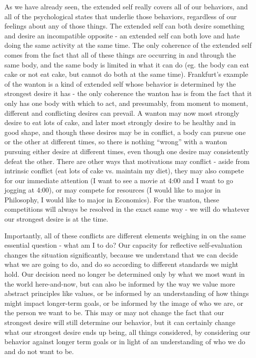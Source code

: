 \documentclass[phd,12pt,oneside,paper=letterpaper]{ubcthesis}
\begin{document}
As we have already seen, the extended self really covers all of our behaviors, and all of the psychological states that underlie those behaviors, regardless of our feelings about any of those things. The extended self can both desire something and desire an incompatible opposite - an extended self can both love and hate doing the same activity at the same time. The only coherence of the extended self comes from the fact that all of these things are occurring in and through the same body, and the same body is limited in what it can do (eg. the body can eat cake or not eat cake, but cannot do both at the same time). Frankfurt's example of the wanton is a kind of extended self whose behavior is determined by the strongest desire it has - the only coherence the wanton has is from the fact that it only has one body with which to act, and presumably, from moment to moment, different and conflicting desires can prevail. A wanton may now most strongly desire to eat lots of cake, and later most strongly desire to be healthy and in good shape, and though these desires may be in conflict, a body can pursue one or the other at different times, so there is nothing ``wrong'' with a wanton pursuing either desire at different times, even though one desire may consistently defeat the other. There are other ways that motivations may conflict - aside from intrinsic conflict (eat lots of cake vs. maintain my diet), they may also compete for our immediate attention (I want to see a movie at 4:00 and I want to go jogging at 4:00), or may compete for resources (I would like to major in Philosophy, I would like to major in Economics). For the wanton, these competitions will always be resolved in the exact same way - we will do whatever our strongest desire is at the time.

Importantly, all of these conflicts are different elements weighing in on the same essential question - what am I to do? Our capacity for reflective self-evaluation changes the situation significantly, because we understand that we can decide what we are going to do, and do so according to different standards we might hold. Our decision need no longer be determined only by what we most want in the world here-and-now, but can also be informed by the way we value more abstract principles like values, or be informed by an understanding of how things might impact longer-term goals, or be informed by the image of who we are, or the person we want to be. This may or may not change the fact that our strongest desire will still determine our behavior, but it can certainly change what our strongest desire ends up being, all things considered, by considering our behavior against longer term goals or in light of an understanding of who we do and do not want to be. 
\end{document}
